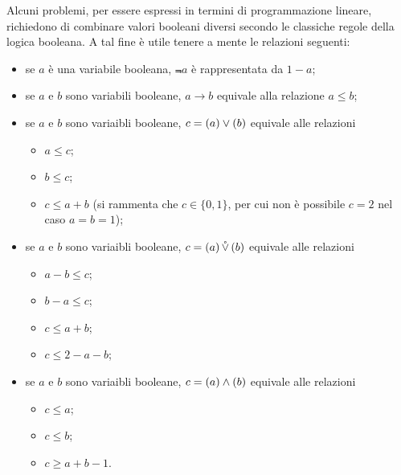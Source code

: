 \par Alcuni problemi, per essere espressi in termini di programmazione lineare, richiedono di combinare valori booleani diversi secondo le classiche regole della logica booleana. A tal fine \`e utile tenere a mente le relazioni seguenti:
\begin{itemize}
	\item se $a$ \`e una variabile booleana, $\Not{a}$ \`e rappresentata da $1 - a$;
	\item se $a$ e $b$ sono variabili booleane, $a \rightarrow b$ equivale alla relazione $a \leq b$;
	\item se $a$ e $b$ sono variaibli booleane, $c = \left ( a \right ) \vee \left ( b \right )$ equivale alle relazioni
	\begin{itemize}
		\item $a \leq c$;
		\item $b \leq c$;
		\item $c \leq a + b$ (si rammenta che $c \in \lbrace 0, 1 \rbrace$, per cui non \`e possibile $c = 2$ nel caso $a = b = 1$);
	\end{itemize}
	\item se $a$ e $b$ sono variaibli booleane, $c = \left ( a \right ) \mathring{\vee} \left ( b \right )$ equivale alle relazioni
	\begin{itemize}
		\item $a - b \leq c$;
		\item $b - a \leq c$;
		\item $c \leq a + b$;
		\item $c \leq 2 - a - b$;
	\end{itemize}
	\item se $a$ e $b$ sono variaibli booleane, $c = \left ( a \right ) \wedge \left ( b \right )$ equivale alle relazioni
	\begin{itemize}
		\item $c \leq a$;
		\item $c \leq b$;
		\item $c \geq a + b - 1$.
	\end{itemize}
\end{itemize}
